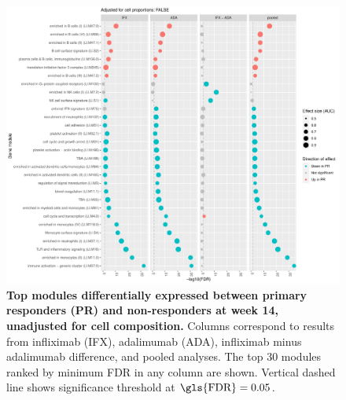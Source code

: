 \begin{figure}
    \centering
    \includegraphics[width=1.0\textwidth,page=1]{mainmatter/figures/chapter_04/plot_gene_set_enrichment.tmodCERNO_panelplot_reversed_C_3RI_3NI,C_3RA_3NA,C_(3RI_3NI)_(3RA_3NA),C_3R_3N.cell_prop_correction_FALSE.pdf}
    \caption[
    ]{
        \textbf{Top modules differentially expressed between primary responders (PR) and non-responders at week 14, unadjusted for cell composition.}
        Columns correspond to results from infliximab (IFX), adalimumab (ADA), infliximab minus adalimumab difference, and pooled analyses. 
        The top 30 modules ranked by minimum \gls{FDR} in any column are shown. Vertical dashed line shows significance threshold at $\text{\gls{FDR}} = 0.05$.
    }
    \label{fig:multipants_dge_panelPlot_week_14_R_N_cellPropF}
\end{figure}

